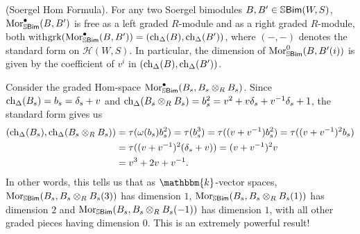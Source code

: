 \noindent\begin{theorem}\textup{(Soergel Hom Formula).}\label{SoergelHom} For any two Soergel bimodules $B, B' \in \mathbb{S}\textnormal{\textsf{Bim}}(W, S)$, %
$\textnormal{Mor}^\bullet_{\mathbb{S}\textnormal{\textsf{Bim}}}(B, B')$ %
is free as a left graded $R$-module and as a right graded $R$-module, both with\linebreak $\textup{grk}(\textnormal{Mor}^\bullet_{\mathbb{S}\textnormal{\textsf{Bim}}}(B, B')) = (\textup{ch}_\Delta(B), \textup{ch}_\Delta(B'))$, where $(-, -)$ denotes the standard form on $\mathscr{H}(W, S)$. In particular, the dimension of $\textnormal{Mor}_{\mathbb{S}\textnormal{\textsf{Bim}}}^0(B, B'(i))$ is given by the coefficient of $v^i$ in $(\textup{ch}_\Delta(B), \textup{ch}_\Delta(B'))$.\newpage
\end{theorem}

\noindent\begin{example} Consider the graded Hom-space $\textnormal{Mor}^\bullet_{\mathbb{S}\textnormal{\textsf{Bim}}}(B_s, B_s \otimes_R B_s)$. Since $\textup{ch}_\Delta(B_s) = b_s = \delta_s + v$ and $\textup{ch}_\Delta(B_s \otimes_R B_s) = b_s^2 = v^2 + v\delta_s + v^{-1}\delta_s + 1$, the standard form gives us
\begin{align*}
\begin{split}
(\textup{ch}_\Delta(B_s), \textup{ch}_\Delta(B_s \otimes_R B_s)) &= \tau(\omega(b_s)b_s^2) = \tau(b_s^3) = \tau((v + v^{-1})b_s^2) = \tau((v + v^{-1})^2b_s)\\
&= \tau((v + v^{-1})^2(\delta_s + v)) = (v + v^{-1})^2v\\
&= v^3 + 2v + v^{-1}.
\end{split}
\end{align*}
\noindent In other words, this tells us that as $\mathbbm{k}$-vector spaces, $\textnormal{Mor}_{\mathbb{S}\textnormal{\textsf{Bim}}}(B_s, B_s \otimes_R B_s(3))$ has dimension $1$, $\textnormal{Mor}_{\mathbb{S}\textnormal{\textsf{Bim}}}(B_s, B_s \otimes_R B_s(1))$ has dimension $2$ and $\textnormal{Mor}_{\mathbb{S}\textnormal{\textsf{Bim}}}(B_s, B_s \otimes_R B_s(-1))$ has dimension $1$, with all other graded pieces having dimension $0$. This is an extremely powerful result!\\
\end{example}



